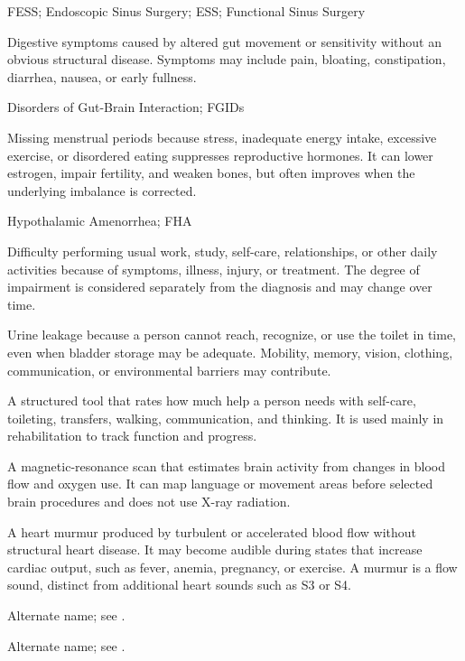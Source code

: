 \synonyms
FESS; Endoscopic Sinus Surgery; ESS; Functional Sinus Surgery

 Digestive symptoms caused by altered gut movement or sensitivity without an obvious structural disease. Symptoms may include pain, bloating, constipation, diarrhea, nausea, or early fullness.

\synonyms
Disorders of Gut-Brain Interaction; FGIDs

 Missing menstrual periods because stress, inadequate energy intake, excessive exercise, or disordered eating suppresses reproductive hormones. It can lower estrogen, impair fertility, and weaken bones, but often improves when the underlying imbalance is corrected.

\synonyms
Hypothalamic Amenorrhea; FHA

 Difficulty performing usual work, study, self-care, relationships, or other daily activities because of symptoms, illness, injury, or treatment. The degree of impairment is considered separately from the diagnosis and may change over time.

 Urine leakage because a person cannot reach, recognize, or use the toilet in time, even when bladder storage may be adequate. Mobility, memory, vision, clothing, communication, or environmental barriers may contribute.

 A structured tool that rates how much help a person needs with self-care, toileting, transfers, walking, communication, and thinking. It is used mainly in rehabilitation to track function and progress.

 A magnetic-resonance scan that estimates brain activity from changes in blood flow and oxygen use. It can map language or movement areas before selected brain procedures and does not use X-ray radiation.

 A heart murmur produced by turbulent or accelerated blood flow without structural heart disease. It may become audible during states that increase cardiac output, such as fever, anemia, pregnancy, or exercise. A murmur is a flow sound, distinct from additional heart sounds such as S3 or S4.

 Alternate name; see .

 Alternate name; see .

